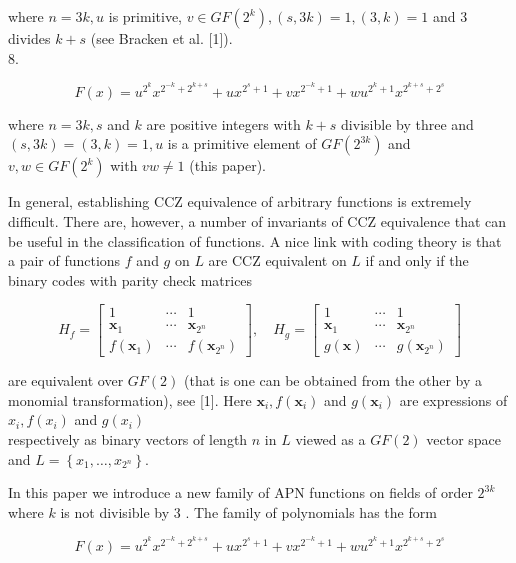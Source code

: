 \documentclass[10pt]{article}
\begin{document}
where $n=3 k, u$ is primitive, $v \in G F\left(2^{k}\right),(s, 3 k)=1,(3, k)=1$ and 3 divides $k+s$ (see Bracken et al. [1]).\\
8.

$$
F(x)=u^{2^{k}} x^{2^{-k}+2^{k+s}}+u x^{2^{s}+1}+v x^{2^{-k}+1}+w u^{2^{k}+1} x^{2^{k+s}+2^{s}}
$$

where $n=3 k, s$ and $k$ are positive integers with $k+s$ divisible by three and $(s, 3 k)=(3, k)=1, u$ is a primitive element of $G F\left(2^{3 k}\right)$ and $v, w \in G F\left(2^{k}\right)$ with $v w \neq 1$ (this paper).

In general, establishing CCZ equivalence of arbitrary functions is extremely difficult. There are, however, a number of invariants of CCZ equivalence that can be useful in the classification of functions. A nice link with coding theory is that a pair of functions $f$ and $g$ on $L$ are CCZ equivalent on $L$ if and only if the binary codes with parity check matrices

$$
H_{f}=\left[\begin{array}{ccc}
1 & \cdots & 1 \\
\mathbf{x}_{1} & \cdots & \mathbf{x}_{2^{n}} \\
f\left(\mathbf{x}_{1}\right) & \cdots & f\left(\mathbf{x}_{2^{n}}\right)
\end{array}\right], \quad H_{g}=\left[\begin{array}{ccc}
1 & \cdots & 1 \\
\mathbf{x}_{1} & \cdots & \mathbf{x}_{2^{n}} \\
g(\mathbf{x}) & \cdots & g\left(\mathbf{x}_{2^{n}}\right)
\end{array}\right]
$$

are equivalent over $G F(2)$ (that is one can be obtained from the other by a monomial transformation), see [1]. Here $\mathbf{x}_{i}, f\left(\mathbf{x}_{i}\right)$ and $g\left(\mathbf{x}_{i}\right)$ are expressions of $x_{i}, f\left(x_{i}\right)$ and $g\left(x_{i}\right)$\\
respectively as binary vectors of length $n$ in $L$ viewed as a $G F(2)$ vector space and $L=\left\{x_{1}, \ldots, x_{2^{n}}\right\}$.

In this paper we introduce a new family of APN functions on fields of order $2^{3 k}$ where $k$ is not divisible by 3 . The family of polynomials has the form

$$
F(x)=u^{2^{k}} x^{2^{-k}+2^{k+s}}+u x^{2^{s}+1}+v x^{2^{-k}+1}+w u^{2^{k}+1} x^{2^{k+s}+2^{s}}
$$
\end{document}
